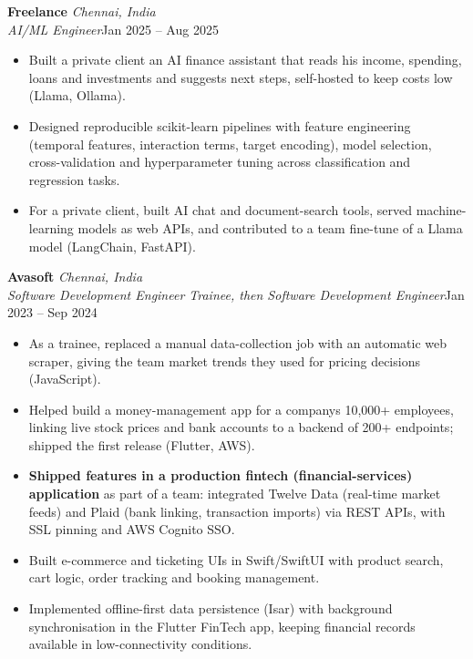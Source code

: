 \documentclass[a4paper,11pt]{article}
\newcommand{\role}[4]{%
  \textbf{#1}{\color{muted}\,\textperiodcentered\,\textit{#2}}\\
  \textit{#4}\hfill{\color{muted}#3}\par}
\newcommand{\gap}{\vspace{5pt}}
\newcommand{\num}[1]{\textbf{#1}}   %
\begin{document}
\gap
{}
\role{Freelance}{Chennai, India}{Jan 2025 – Aug 2025}{AI/ML Engineer}
\begin{itemize}
  \item Built a private client an AI finance assistant that reads his income, spending, loans and investments and suggests next steps, self-hosted to keep costs low (Llama, Ollama).
  \item Designed reproducible scikit-learn pipelines with feature engineering (temporal features, interaction terms, target encoding), model selection, cross-validation and hyperparameter tuning across classification and regression tasks.
  \item For a private client, built AI chat and document-search tools, served machine-learning models as web APIs, and contributed to a team fine-tune of a Llama model (LangChain, FastAPI).
\end{itemize}
\gap
{}
\role{Avasoft}{Chennai, India}{Jan 2023 – Sep 2024}{Software Development Engineer Trainee, then Software Development Engineer}
\begin{itemize}
  \item As a trainee, replaced a manual data-collection job with an automatic web scraper, giving the team market trends they used for pricing decisions (JavaScript).
  \item Helped build a money-management app for a company\textquotesingle{}s 10,000+ employees, linking live stock prices and bank accounts to a backend of 200+ endpoints; shipped the first release (Flutter, AWS).
  \item \num{Shipped features in a production fintech (financial-services) application} as part of a team: integrated Twelve Data (real-time market feeds) and Plaid (bank linking, transaction imports) via REST APIs, with SSL pinning and AWS Cognito SSO.
  \item Built e-commerce and ticketing UIs in Swift/SwiftUI with product search, cart logic, order tracking and booking management.
  \item Implemented offline-first data persistence (Isar) with background synchronisation in the Flutter FinTech app, keeping financial records available in low-connectivity conditions.
\end{itemize}
\end{document}
